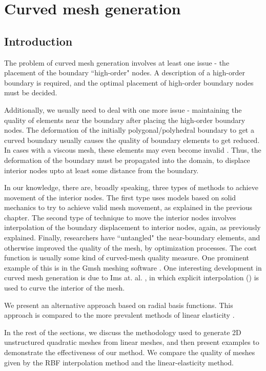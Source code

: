 \chapter{Curved mesh generation}
\section{Introduction}

The problem of curved mesh generation involves at least one issue - the placement of the boundary ``high-order" nodes. A description of a high-order boundary is required, and the optimal placement of high-order boundary nodes must be decided.

Additionally, we usually need to deal with one more issue - maintaining the quality of elements near the boundary after placing the high-order boundary nodes. The deformation of the initially polygonal/polyhedral boundary to get a curved boundary usually causes the quality of boundary elements to get reduced. In cases with a viscous mesh, these elements may even become invalid \cite{curve:persson, gmsh:untangling}. Thus, the deformation of the boundary must be propagated into the domain, to displace interior nodes upto at least some distance from the boundary.

In our knowledge, there are, broadly speaking, three types of methods to achieve movement of the interior nodes. The first type uses models based on solid mechanics to try to achieve valid mesh movement, as explained in the previous chapter. The second type of technique to move the interior nodes involves interpolation of the boundary displacement to interior nodes, again, as previously explained. Finally, researchers have ``untangled" the near-boundary elements, and otherwise improved the quality of the mesh, by optimization processes. The cost function is usually some kind of curved-mesh quality measure. One prominent example of this is in the Gmsh meshing software \cite{gmsh:untangling}. One interesting development in curved mesh generation is due to Ims at. al. \cite{curve:meshcurve}, in which explicit interpolation (\cite{mm:explicit}) is used to curve the interior of the mesh. 

We present an alternative approach based on radial basis functions. This approach is compared to the more prevalent methods of linear elasticity \cite{curve:hartmann}.

In the rest of the sections, we discuss the methodology used to generate 2D unstructured quadratic meshes from linear meshes, and then present examples to demonstrate the effectiveness of our method. We compare the quality of meshes given by the RBF interpolation method and the linear-elasticity method.

